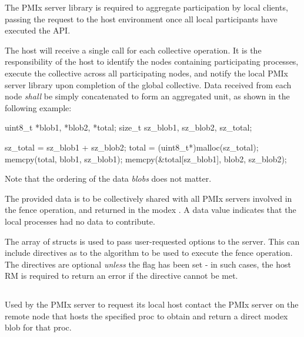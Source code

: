\adviceimplstart
The \ac{PMIx} server library is required to aggregate participation by local clients, passing the request to the host environment once all local participants have executed the \ac{API}.
\adviceimplend

\advicermstart
The host will receive a single call for each collective operation. It is the responsibility of the host to identify the nodes containing participating processes, execute the collective across all participating nodes, and notify the local \ac{PMIx} server library upon completion of the global collective. Data received from each node \emph{shall} be simply concatenated to form an aggregated unit, as shown in the following example:

\cspecificstart
\begin{codepar}
uint8_t *blob1, *blob2, *total;
size_t sz_blob1, sz_blob2, sz_total;

sz_total = sz_blob1 + sz_blob2;
total = (uint8_t*)malloc(sz_total);
memcpy(total, blob1, sz_blob1);
memcpy(\&total[sz_blob1], blob2, sz_blob2);
\end{codepar}
\cspecificend

Note that the ordering of the data \emph{blobs} does not matter.
\advicermend

The provided data is to be collectively shared with all \ac{PMIx} servers involved in the fence operation, and returned in the modex .
A  data value indicates that the local processes had no data to contribute.

The array of  structs is used to pass user-requested options to the server.
This can include directives as to the algorithm to be used to execute the fence operation.
The directives are optional \emph{unless} the  flag has been set - in such cases, the host \ac{RM} is required to return an error if the directive cannot be met.


\subsection{}

\summary

Used by the PMIx server to request its local host contact the \ac{PMIx} server on the remote node that hosts the specified proc to obtain and return a direct modex blob for that proc.

\format


